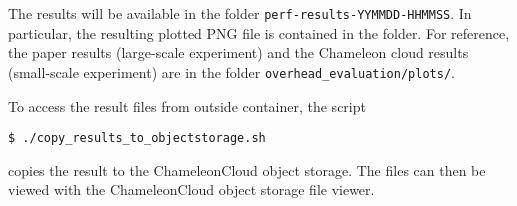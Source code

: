 \documentclass[twoside]{article}
\begin{document}
The results will be available in the folder \texttt{perf-results-YYMMDD-HHMMSS}.
In particular, the resulting plotted PNG file is contained in the folder.
For reference, the paper results (large-scale experiment) and the Chameleon cloud results (small-scale experiment) are in the folder \texttt{overhead\_evaluation/plots/}.

To access the result files from outside container, the script 

{
\small
\begin{verbatim}
$ ./copy_results_to_objectstorage.sh
\end{verbatim}
}

copies the result to the ChameleonCloud object storage.
The files can then be viewed with the ChameleonCloud object storage file viewer.

\end{document}
